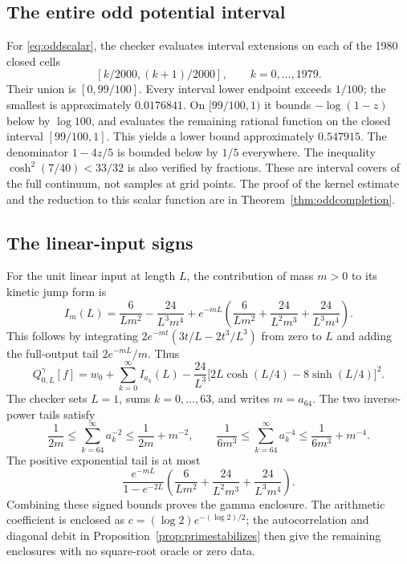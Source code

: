 \documentclass[11pt]{article}
\numberwithin{equation}{section}
\theoremstyle{definition}
\theoremstyle{remark}
\newcommand{\Qgam}{Q^{\gamma}}
\begin{document}
\subsection{The entire odd potential interval}

For \eqref{eq:oddscalar}, the checker evaluates interval extensions on
each of the 1980 closed cells
\[
[k/2000,(k+1)/2000],\qquad k=0,\ldots,1979.
\]
Their union is $[0,99/100]$. Every interval lower endpoint exceeds $1/100$;
the smallest is approximately $0.0176841$. On $[99/100,1)$ it bounds
$-\log(1-z)$ below by $\log100$, and evaluates the remaining rational
function on the closed interval $[99/100,1]$. This yields a lower bound
approximately $0.547915$. The denominator $1-4z/5$ is bounded below by
$1/5$ everywhere. The inequality $\cosh^2(7/40)<33/32$ is also verified
by fractions. These are interval covers of the full continuum, not
samples at grid points. The proof of the kernel estimate and the reduction
to this scalar function are in Theorem~\ref{thm:oddcompletion}.

\subsection{The linear-input signs}

For the unit linear input at length $L$, the contribution of mass $m>0$
to its kinetic jump form is
\begin{equation}
I_m(L)=\frac6{Lm^2}-\frac{24}{L^3m^4}
+e^{-mL}\left(\frac6{Lm^2}+\frac{24}{L^2m^3}
                         +\frac{24}{L^3m^4}\right).
\end{equation}
This follows by integrating
$2e^{-mt}(3t/L-2t^3/L^3)$ from zero to $L$ and adding the full-output
tail $2e^{-mL}/m$. Thus
\begin{equation}
\Qgam_{0,L}[f]=w_0+\sum_{k=0}^\infty I_{a_k}(L)
-\frac{24}{L^3}\bigl[2L\cosh(L/4)-8\sinh(L/4)\bigr]^2.
\end{equation}
The checker sets $L=1$, sums $k=0,\ldots,63$, and writes $m=a_{64}$.
The two inverse-power tails satisfy
\[
\frac1{2m}\leq\sum_{k=64}^\infty a_k^{-2}\leq\frac1{2m}+m^{-2},
\qquad
\frac1{6m^3}\leq\sum_{k=64}^\infty a_k^{-4}
\leq\frac1{6m^3}+m^{-4}.
\]
The positive exponential tail is at most
\[
\frac{e^{-mL}}{1-e^{-2L}}
\left(\frac6{Lm^2}+\frac{24}{L^2m^3}+\frac{24}{L^3m^4}\right).
\]
Combining these signed bounds proves the gamma enclosure. The arithmetic
coefficient is enclosed as $c=(\log2)e^{-(\log2)/2}$; the autocorrelation
and diagonal debit in Proposition~\ref{prop:primestabilizes} then give the
remaining enclosures with no square-root oracle or zero data.
\end{document}
